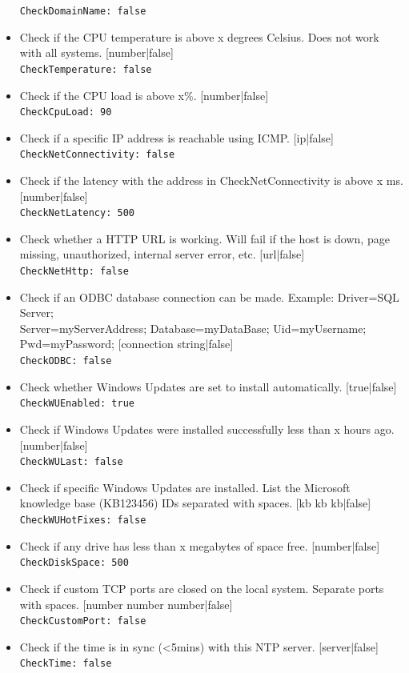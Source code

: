 \documentclass[11pt]{article}
\begin{document}
\begin{itemize}
\texttt{CheckDomainName: false}
\item Check if the CPU temperature is above x degrees Celsius. Does not work with all systems. [number|false]\\
\texttt{CheckTemperature: false}
\item Check if the CPU load is above x\%. [number|false]\\
\texttt{CheckCpuLoad: 90}
\item Check if a specific IP address is reachable using ICMP. [ip|false]\\
\texttt{CheckNetConnectivity: false}
\item Check if the latency with the address in CheckNetConnectivity is above x ms. [number|false]\\
\texttt{CheckNetLatency: 500}
\item Check whether a HTTP URL is working. Will fail if the host is down, page missing, unauthorized, internal server error, etc. [url|false]\\
\texttt{CheckNetHttp: false}
\item Check if an ODBC database connection can be made. Example: Driver={SQL Server};\\ Server=myServerAddress; Database=myDataBase; Uid=myUsername; Pwd=myPassword; [connection string|false]\\
\texttt{CheckODBC: false}
\item Check whether Windows Updates are set to install automatically. [true|false]\\
\texttt{CheckWUEnabled: true}
\item Check if Windows Updates were installed successfully less than x hours ago. [number|false]\\
\texttt{CheckWULast: false}
\item Check if specific Windows Updates are installed. List the Microsoft knowledge base (KB123456) IDs separated with spaces. [kb kb kb|false]\\
\texttt{CheckWUHotFixes: false}
\item Check if any drive has less than x megabytes of space free. [number|false]\\
\texttt{CheckDiskSpace: 500}
\item Check if custom TCP ports are closed on the local system. Separate ports with spaces. [number number number|false]\\
\texttt{CheckCustomPort: false}
\item Check if the time is in sync (<5mins) with this NTP server. [server|false]\\
\texttt{CheckTime: false}
\end{itemize}
\end{document}
